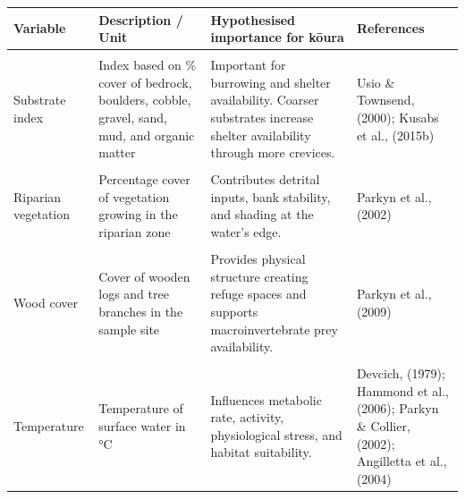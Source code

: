 \documentclass[
  letterpaper,
  DIV=11,
  numbers=noendperiod]{scrartcl}
\begin{document}
\begin{landscape}
\begin{longtable}[t]{>{\raggedright\arraybackslash}p{2.5cm}>{\raggedright\arraybackslash}p{3.5cm}>{\raggedright\arraybackslash}p{9.5cm}>{\raggedright\arraybackslash}p{5.0cm}}
\toprule
Variable & Description / Unit & Hypothesised importance for kōura & References\\
\midrule
\cellcolor{gray!8}{Lake identity} & \cellcolor{gray!8}{Categorical variable identifying lake} & \cellcolor{gray!8}{Captures unmeasured lake-specific differences in water chemistry, productivity, and catchment characteristics.} & \cellcolor{gray!8}{Zuur et al., (2009)}\\
Substrate index & Index based on \% cover of bedrock, boulders, cobble, gravel, sand, mud, and organic matter & Important for burrowing and shelter availability. Coarser substrates increase shelter availability through more crevices. & Usio \& Townsend, (2000); Kusabs et al., (2015b)\\
\cellcolor{gray!8}{Slope} & \cellcolor{gray!8}{Slope from shoreline to the 5 m depth contour} & \cellcolor{gray!8}{Steeper slopes facilitate access to deeper water during daylight refuging and associate with coarser substrates.} & \cellcolor{gray!8}{Devcich, (1979); Kusabs et al., (2015b)}\\
Riparian vegetation & Percentage cover of vegetation growing in the riparian zone & Contributes detrital inputs, bank stability, and shading at the water's edge. & Parkyn et al., (2002)\\
\cellcolor{gray!8}{Overhanging trees} & \cellcolor{gray!8}{Percentage cover of trees hanging over the shoreline} & \cellcolor{gray!8}{Provides direct shading and structural inputs into littoral habitats.} & \cellcolor{gray!8}{Smith et al., (1996); Vedia et al., (2017)}\\
\addlinespace
Wood cover & Cover of wooden logs and tree branches in the sample site & Provides physical structure creating refuge spaces and supports macroinvertebrate prey availability. & Parkyn et al., (2009)\\
\cellcolor{gray!8}{Emergent and submerged macrophytes} & \cellcolor{gray!8}{Percentage cover of macrophytes in the sample site divided over emergent and submerged and native and non-native species} & \cellcolor{gray!8}{Native macrophytes can provide cover and serve as a food source. Non-native macrophytes may alter movement pathways and modify local habitat and water quality conditions.} & \cellcolor{gray!8}{Coffey \& Clayton, (1988); Kusabs \& Quinn, (2009)}\\
Temperature & Temperature of surface water in °C & Influences metabolic rate, activity, physiological stress, and habitat suitability. & Devcich, (1979); Hammond et al., (2006); Parkyn \& Collier, (2002); Angilletta et al., (2004)\\

\end{longtable}
\end{landscape}
\end{document}
